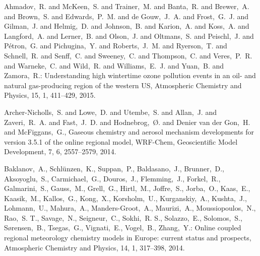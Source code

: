 \documentclass{article}
\begin{document}
\begin{thebibliography}{12}

     Ahmadov,~R. and McKeen,~S. and Trainer,~M. and Banta,~R. and Brewer,~A. and Brown,~S. and Edwards,~P.~M. and de Gouw,~J.~A. and Frost,~G.~J. and Gilman,~J. and Helmig,~D. and Johnson,~B. and Karion,~A. and Koss,~A. and Langford,~A. and Lerner,~B. and Olson,~J. and Oltmans,~S. and Peischl,~J. and P\'etron,~G. and Pichugina,~Y. and Roberts,~J.~M. and Ryerson,~T. and Schnell,~R. and Senff,~C. and Sweeney,~C. and Thompson,~C. and Veres,~P.~R. and Warneke,~C. and Wild,~R. and Williams,~E.~J. and Yuan,~B. and Zamora,~R.: Understanding high wintertime ozone pollution events in an oil- and natural gas-producing region of the western US, Atmospheric Chemistry and Physics, 15, 1, 411--429, 2015.

     Archer-Nicholls,~S. and Lowe,~D. and Utembe,~S. and Allan,~J. and Zaveri,~R.~A. and Fast,~J.~D. and Hodnebrog,~{\O}. and Denier van der Gon,~H. and McFiggans,~G., Gaseous chemistry and aerosol mechanism developments for version 3.5.1 of the online regional model, WRF-Chem, Geoscientific Model Development, 7, 6, 2557--2579, 2014.

     Baklanov,~A., Schl{\"u}nzen,~K., Suppan,~P., Baldasano,~J., Brunner,~D., Aksoyoglu,~S., Carmichael,~G., Douros,~J., Flemming,~J., Forkel,~R., Galmarini,~S., Gauss,~M., Grell,~G., Hirtl,~M., Joffre,~S., Jorba,~O., Kaas,~E., Kaasik,~M., Kallos,~G., Kong,~X., Korsholm,~U., Kurganskiy,~A., Kushta,~J., Lohmann,~U., Mahura,~A., Manders-Groot,~A., Maurizi,~A., Moussiopoulos,~N., Rao,~S. T., Savage,~N., Seigneur,~C., Sokhi,~R. S., Solazzo,~E., Solomos,~S., S{\o}rensen,~B., Tsegas,~G., Vignati,~E., Vogel,~B., Zhang,~Y.: Online coupled regional meteorology chemistry models in Europe: current status and prospects, Atmospheric Chemistry and Physics, 14, 1, 317--398, 2014.


\end{thebibliography}
\end{document}

